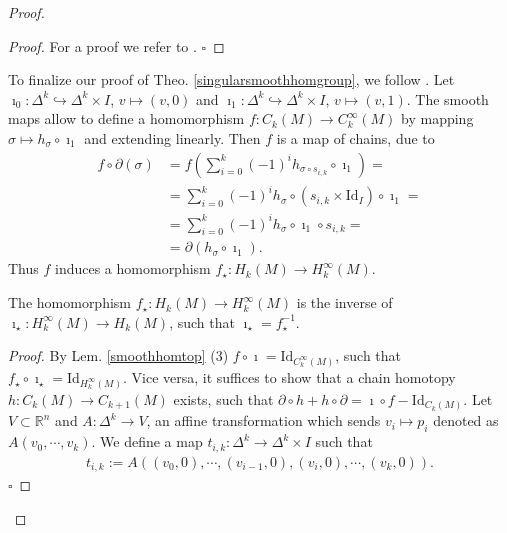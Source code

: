 \documentclass[envcountsect,runningheads]{llncs}
\renewcommand{\qed}{\hfill$\square$}
\begin{document}
\begin{proof}
\begin{proof}
For a proof we refer to \cite[Lem.~2.3]{parkproof}. \qed
\end{proof}
To finalize our proof of Theo. \ref{singularsmoothhomgroup}, we follow \cite[Theo.~2.4]{parkproof}. Let $\imath_0: \Delta^k \hookrightarrow \Delta^k \times I$, $v \mapsto (v,0)$ and $\imath_1: \Delta^k \hookrightarrow \Delta^k \times I$, $v \mapsto (v,1)$. The smooth maps allow to define a homomorphism $f: C_k(M) \rightarrow C^{\infty}_{k}(M)$ by mapping $\sigma \mapsto h_\sigma \circ \imath_1$ and extending linearly. Then $f$ is a map of chains, due to
\begin{align}
f \circ \partial(\sigma) &= f\left( \sum_{i=0}^{k} (-1)^{i} h_{\sigma \circ s_{i,k}} \circ \imath_1 \right) =\\
&= \sum_{i=0}^{k} (-1)^i h_\sigma \circ (s_{i,k} \times \text{Id}_{I}) \circ \imath_1 =\\
&= \sum_{i=0}^{k} (-1)^i h_\sigma \circ \imath_1 \circ s_{i,k} =\\
&= \partial(h_\sigma \circ \imath_1).
\end{align}
Thus $f$ induces a homomorphism $f_{\star}:H_k(M) \rightarrow H^{\infty}_{k}(M)$.

\begin{proposition}
The homomorphism $f_{\star}:H_k(M) \rightarrow H^{\infty}_{k}(M)$ is the inverse of $\imath_{\star}: H^{\infty}_{k}(M) \rightarrow H_k(M)$, such that $\imath_{\star} = f_{\star}^{-1}$.
\end{proposition}
\begin{proof}
By Lem. \ref{smoothhomtop} (3) $f \circ \imath = \text{Id}_{C_{k}^{\infty}(M)}$, such that $f_{\star} \circ \imath_{\star} = \text{Id}_{H_{k}^{\infty}(M)}$. Vice versa, it suffices to show that a chain homotopy $h: C_k(M) \rightarrow C_{k+1}(M)$ exists, such that $\partial \circ h + h \circ \partial = \imath \circ f - \text{Id}_{C_{k}(M)}$. Let $V \subset \mathbb{R}^n$ and $A: \Delta^{k} \rightarrow V$, an affine transformation which sends $v_i \mapsto p_i$ denoted as $A(v_0, \cdots, v_k)$. We define a map $t_{i,k}: \Delta^{k} \rightarrow \Delta^{k} \times I$ such that
\begin{align}
	t_{i,k} := A\left( \left( v_0,0 \right),\cdots,\left( v_{i-1},0 \right),\left( v_i,0 \right),\cdots,\left( v_k,0 \right) \right).
\end{align}
\qed
\end{proof}


\end{proof}
\end{document}
